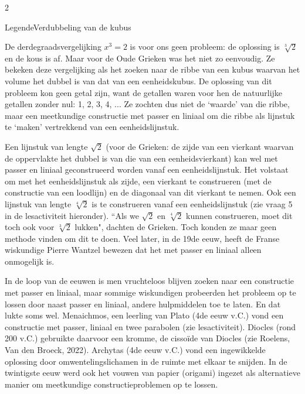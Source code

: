 \begin{multicols}{2}
\begin{kader}{Legende}{Verdubbeling van de kubus}
	\end{kader}
	
	
	
	De derdegraadsvergelijking $x^3=2$ is voor ons geen probleem: de oplossing is $\sqrt[3]{2}$ en de kous is af. Maar voor de Oude Grieken was het niet zo eenvoudig. Ze bekeken deze vergelijking als het zoeken naar de ribbe van een kubus waarvan het volume het dubbel is van dat van een eenheidskubus. De oplossing van dit probleem kon geen getal zijn, want de getallen waren voor hen de natuurlijke getallen zonder nul: 1, 2, 3, 4, ... Ze zochten dus niet de `waarde' van die ribbe, maar een meetkundige constructie met passer en liniaal om die ribbe als lijnstuk te `maken' vertrekkend van een eenheidslijnstuk. 
	
	
	Een lijnstuk van lengte $\sqrt{2}$ (voor de Grieken: de zijde van een vierkant waarvan de oppervlakte het dubbel is van die van een eenheidsvierkant) kan wel met passer en liniaal geconstrueerd worden vanaf een eenheidslijnstuk. Het volstaat om met het eenheidslijnstuk als zijde, een vierkant te construeren (met de constructie van een loodlijn) en de diagonaal van dit vierkant te nemen. Ook een lijnstuk van lengte $\sqrt[4]{2}$ is te construeren vanaf een eenheidslijnstuk (zie vraag 5 in de lesactiviteit hieronder). ``Als we $\sqrt{2}$ en $\sqrt[4]{2}$ kunnen construeren, moet dit toch ook voor $\sqrt[3]{2}$ lukken", dachten de Grieken. Toch konden ze maar geen methode vinden om dit te doen. Veel later, in de 19de eeuw, heeft de Franse wiskundige Pierre Wantzel bewezen dat het met passer en liniaal alleen onmogelijk is.
	
	In de loop van de eeuwen is men vruchteloos blijven zoeken naar een constructie met passer en liniaal, maar sommige wiskundigen probeerden het probleem op te lossen door naast passer en liniaal, andere hulpmiddelen toe te laten. En dat lukte soms wel. Menaichmos, een leerling van Plato (4de eeuw v.C.) vond een constructie met passer, liniaal en twee parabolen (zie lesactiviteit). Diocles (rond 200 v.C.) gebruikte daarvoor een kromme, de cissoïde van Diocles (zie Roelens, Van den Broeck, 2022). Archytas (4de eeuw v.C.) vond een ingewikkelde oplossing door omwentelingslichamen in de ruimte met elkaar te snijden. In de twintigste eeuw werd ook het vouwen van papier (origami) ingezet als alternatieve manier om meetkundige constructieproblemen op te lossen. 
	
\end{multicols}

